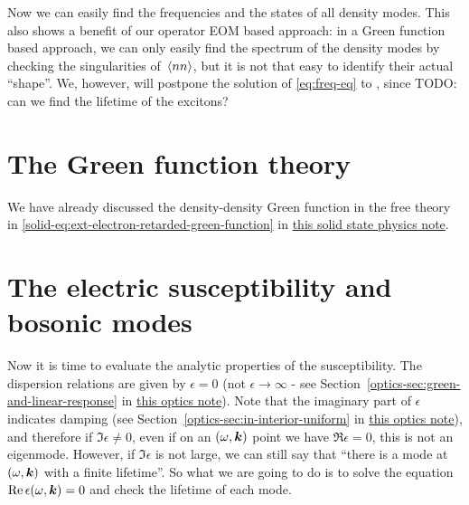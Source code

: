 \documentclass[hyperref, a4paper]{article}
\newcommand{\soliddoc}{\href{../solid/solid.pdf}{this solid state physics note}}
\newcommand{\opticsdoc}{\href{../optics/optics.pdf}{this optics note}}
\begin{document}
Now we can easily find the frequencies and the states of all density modes. This also shows a benefit 
of our operator EOM based approach: in a Green function based approach, we can only easily find the 
spectrum of the density modes by checking the singularities of $\expval*{nn}$, but it is not that 
easy to identify their actual ``shape''. We, however, will postpone the solution of \eqref{eq:freq-eq} \marginnote{}
to , since TODO: can we find the lifetime of the excitons?

\section{The Green function theory}\label{sec:green}

We have already discussed the density-density Green function in the free theory in \eqref{solid-eq:ext-electron-retarded-green-function} in \soliddoc. 


\section{The electric susceptibility and bosonic modes}\label{sec:boson-modes}

Now it is time to evaluate the analytic properties of the susceptibility. 
The dispersion relations are given by $\epsilon = 0$ (not $\epsilon \to \infty$ - see 
Section~\ref{optics-sec:green-and-linear-response} in \opticsdoc). 
Note that the imaginary part of $\epsilon$ indicates damping (see Section~\ref{optics-sec:in-interior-uniform}
in \opticsdoc), and therefore if $\Im \epsilon \neq 0$, even if on an $(\omega, \vb*{k})$ point we have 
$\Re \epsilon = 0$, this is not an eigenmode. However, if $\Im \epsilon$ is not large, we can still say 
that ``there is a mode at $(\omega, \vb*{k})$ with a finite lifetime''. So what we are going to do is 
to solve the equation $\Re \epsilon(\omega, \vb*{k}) = 0$ and check the lifetime of each mode.
\end{document}
